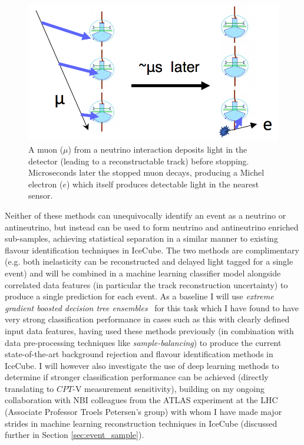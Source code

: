 \documentclass[a4paper,11pt]{article}
\begin{document}

\begin{figure} %
    \centering
    \includegraphics[trim=0.0cm 0.0cm 0.0cm 0.0cm, clip=true, width=\linewidth]{images/michel_electron.png}
    \caption{A muon ($\mu$) from a neutrino interaction deposits light in the detector (leading to a reconstructable track) before stopping. Microseconds later the stopped muon decays, producing a Michel electron ($e$) which itself produces detectable light in the nearest sensor. }
    \label{fig:michel_electron}
\end{figure}

Neither of these methods can unequivocally identify an event as a neutrino or antineutrino, but instead can be used to form neutrino and antineutrino enriched sub-samples, achieving statistical separation in a similar manner to existing flavour identification techniques in IceCube. The two methods are complimentary (e.g. both inelasticity can be reconstructed and delayed light tagged for a single event) and will be combined in a machine learning classifier model alongside correlated data features (in particular the track reconstruction uncertainty) to produce a single prediction for each event. As a baseline I will use \textit{extreme gradient boosted decision tree ensembles}~\cite{Chen:2016btl} for this task which I have found to have very strong classification performance in cases such as this with clearly defined input data features, having used these methods previously (in combination with data pre-processing techniques like \textit{sample-balancing}) to produce the current state-of-the-art background rejection and flavour identification methods in IceCube. I will however also investigate the use of deep learning methods to determine if stronger classification performance can be achieved (directly translating to $CPT$-V measurement sensitivity), building on my ongoing collaboration with NBI colleagues from the ATLAS experiment at the LHC (Associate Professor Troels Petersen's group) with whom I have made major strides in machine learning reconstruction techniques in IceCube (discussed further in Section \ref{sec:event_sample}).
 
\end{document}
